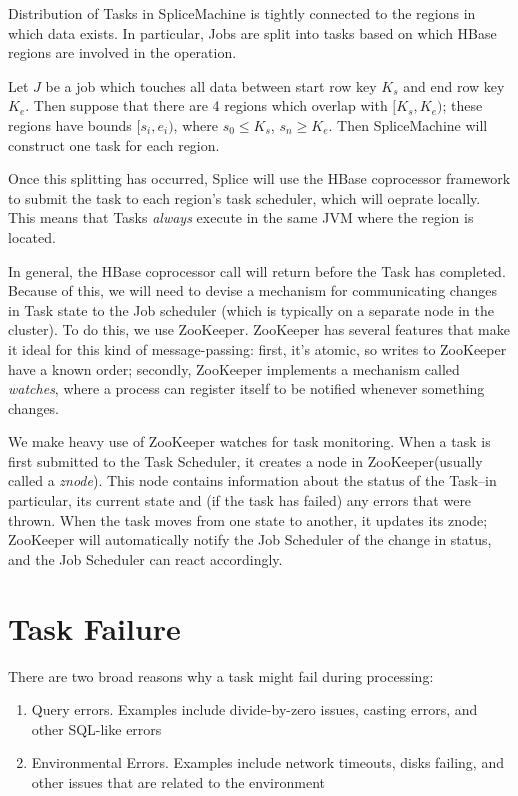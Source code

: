 Distribution of Tasks in SpliceMachine is tightly connected to the regions in which data exists. In particular, Jobs are split into tasks based on which HBase regions are involved in the operation. 

Let $J$ be a job which touches all data between start row key $K_s$ and end row key $K_e$. Then suppose that there are 4 regions which overlap with $[K_s,K_e)$; these regions have bounds $[s_i,e_i)$, where $s_0 \leq K_s$, $s_n \geq K_e$. Then SpliceMachine will construct one task for each region. 

Once this splitting has occurred, Splice will use the HBase coprocessor framework to submit the task to each region's task scheduler, which will oeprate locally. This means that Tasks \emph{always} execute in the same JVM where the region is located.

In general, the HBase coprocessor call will return before the Task has completed. Because of this, we will need to devise a mechanism for communicating changes in Task state to the Job scheduler (which is typically on a separate node in the cluster). To do this, we use ZooKeeper. ZooKeeper has several features that make it ideal for this kind of message-passing: first, it's atomic, so writes to ZooKeeper have a known order; secondly, ZooKeeper implements a mechanism called \emph{watches}, where a process can register itself to be notified whenever something changes.

We make heavy use of ZooKeeper watches for task monitoring. When a task is first submitted to the Task Scheduler, it creates a node in ZooKeeper(usually called a \emph{znode}). This node contains information about the status of the Task--in particular, its current state and (if the task has failed) any errors that were thrown. When the task moves from one state to another, it updates its znode; ZooKeeper will automatically notify the Job Scheduler of the change in status, and the Job Scheduler can react accordingly.

\section{Task Failure}
There are two broad reasons why a task might fail during processing:

\begin{enumerate}
\item Query errors. Examples include divide-by-zero issues, casting errors, and other SQL-like errors
\item Environmental Errors. Examples include network timeouts, disks failing, and other issues that are related to the environment
\end{enumerate}


